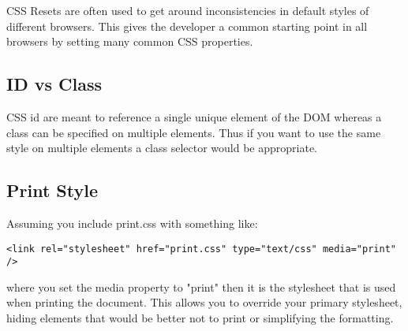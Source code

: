 \documentclass[12pt]{amsart}
\begin{document}
CSS Resets are often used to get around inconsistencies in default styles of different browsers. This gives the developer a common starting point in all browsers by setting many common CSS properties.

\subsection{ID vs Class}

CSS id are meant to reference a single unique element of the DOM whereas a class can be specified on multiple elements. Thus if you want to use the same style on multiple elements a class selector would be appropriate.

\subsection{Print Style}
Assuming you include print.css with something like:
\begin{verbatim}
<link rel="stylesheet" href="print.css" type="text/css" media="print" /> 
\end{verbatim}
where you set the media property to "print" then it is the stylesheet that is used when printing the document. This allows you to override your primary stylesheet, hiding elements that would be better not to print or simplifying the formatting.
\end{document}
